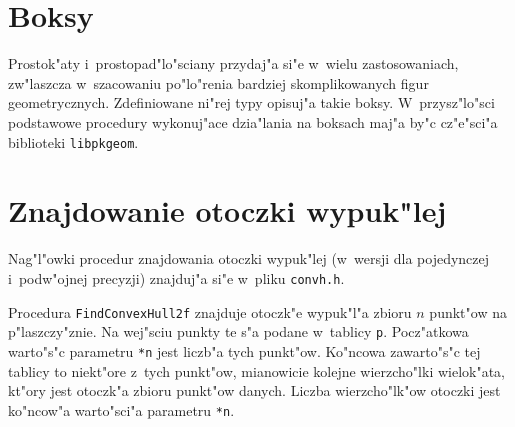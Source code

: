 \section{Boksy}

Prostok"aty i~prostopad"lo"sciany przydaj"a si"e w~wielu zastosowaniach,
zw"laszcza w~szacowaniu po"lo"renia bardziej skomplikowanych figur
geometrycznych. Zdefiniowane ni"rej typy opisuj"a takie boksy.
W~przysz"lo"sci podstawowe procedury wykonuj"ace dzia"lania na boksach
maj"a by"c cz"e"sci"a biblioteki \texttt{libpkgeom}.

\vspace{\bigskipamount}


\section{Znajdowanie otoczki wypuk"lej}

Nag"l"owki procedur znajdowania otoczki wypuk"lej (w~wersji dla pojedynczej
i~podw"ojnej precyzji) znajduj"a si"e w~pliku \texttt{convh.h}.

\vspace{\bigskipamount}
Procedura \texttt{FindConvexHull2f} znajduje otoczk"e
wypuk"l"a zbioru $n$ punkt"ow na p"laszczy"znie.
Na wej"sciu punkty te s"a podane w~tablicy \texttt{p}. Pocz"atkowa warto"s"c
parametru \texttt{*n} jest liczb"a tych punkt"ow. Ko"ncowa zawarto"s"c tej
tablicy to niekt"ore z~tych punkt"ow, mianowicie kolejne wierzcho"lki
wielok"ata, kt"ory jest otoczk"a zbioru punkt"ow danych. Liczba
wierzcho"lk"ow otoczki jest ko"ncow"a warto"sci"a parametru \texttt{*n}.



